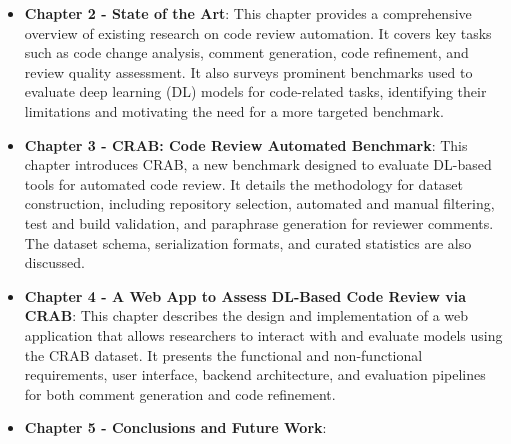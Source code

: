 \begin{itemize}
	\item \textbf{Chapter 2 - State of the Art}: This chapter provides a comprehensive overview of
	      existing research on code review automation. It covers key tasks such as code change
	      analysis, comment generation, code refinement, and review quality assessment. It also
	      surveys prominent benchmarks used to evaluate deep learning (DL) models for code-related
	      tasks, identifying their limitations and motivating the need for a more targeted benchmark.

	\item \textbf{Chapter 3 - CRAB: Code Review Automated Benchmark}: This chapter introduces CRAB,
	      a new benchmark designed to evaluate DL-based tools for automated code review. It details
	      the methodology for dataset construction, including repository selection, automated and
	      manual filtering, test and build validation, and paraphrase generation for reviewer
	      comments. The dataset schema, serialization formats, and curated statistics are also
	      discussed.

	\item \textbf{Chapter 4 - A Web App to Assess DL-Based Code Review via CRAB}: This chapter
	      describes the design and implementation of a web application that allows researchers to
	      interact with and evaluate models using the CRAB dataset. It presents the functional and
	      non-functional requirements, user interface, backend architecture, and evaluation pipelines
	      for both comment generation and code refinement.

	\item \textbf{Chapter 5 - Conclusions and Future Work}: 
\end{itemize}
